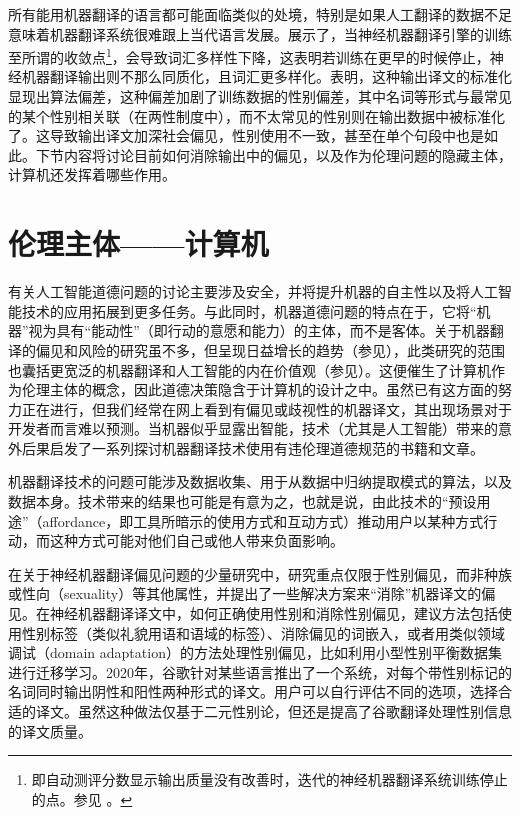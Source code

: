 \documentclass[output=paper]{langscibook}
\begin{document}
所有能用机器翻译的语言都可能面临类似的处境，特别是如果人工翻译的数据不足意味着机器翻译系统很难跟上当代语言发展。\citet{VanmassenhoveWay2019}展示了，当神经机器翻译引擎的训练至所谓的收敛点\footnote{即自动测评分数显示输出质量没有改善时，迭代的神经机器翻译系统训练停止的点。参见 。}，会导致词汇多样性下降，这表明若训练在更早的时候停止，神经机器翻译输出则不那么同质化，且词汇更多样化。\citet{Vanmassenhove2019}表明，这种输出译文的标准化显现出算法偏差，这种偏差加剧了训练数据的性别偏差，其中名词等形式与最常见的某个性别相关联（在两性制度中），而不太常见的性别则在输出数据中被标准化了。这导致输出译文加深社会偏见，性别使用不一致，甚至在单个句段中也是如此。下节内容将讨论目前如何消除输出中的偏见，以及作为伦理问题的隐藏主体，计算机还发挥着哪些作用。

\section{伦理主体——计算机}\label{sec:moorkens:6}
有关人工智能道德问题的讨论主要涉及安全，并将提升机器的自主性以及将人工智能技术的应用拓展到更多任务。与此同时，机器道德问题的特点在于，它将“机器”视为具有“能动性”（即行动的意愿和能力）的主体，而不是客体。关于机器翻译的偏见和风险的研究虽不多，但呈现日益增长的趋势（参见），此类研究的范围也囊括更宽泛的机器翻译和人工智能的内在价值观（参见）。这便催生了计算机作为伦理主体的概念，因此道德决策隐含于计算机的设计之中。虽然已有这方面的努力正在进行，但我们经常在网上看到有偏见或歧视性的机器译文，其出现场景对于开发者而言难以预测。当机器似乎显露出智能，技术（尤其是人工智能）带来的意外后果启发了一系列探讨机器翻译技术使用有违伦理道德规范的书籍和文章。

机器翻译技术的问题可能涉及数据收集、用于从数据中归纳提取模式的算法，以及数据本身。技术带来的结果也可能是有意为之，也就是说，由此技术的“预设用途”（affordance，即工具所暗示的使用方式和互动方式）推动用户以某种方式行动，而这种方式可能对他们自己或他人带来负面影响。

在关于神经机器翻译偏见问题的少量研究中，研究重点仅限于性别偏见，而非种族或性向（sexuality）等其他属性，并提出了一些解决方案来“消除”机器译文的偏见。在神经机器翻译译文中，如何正确使用性别和消除性别偏见，建议方法包括使用性别标签（类似礼貌用语和语域的标签）、消除偏见的词嵌入，或者用类似领域调试（domain adaptation）的方法处理性别偏见，比如利用小型性别平衡数据集进行迁移学习\citep{TomalinUllmann2021}。2020年，谷歌针对某些语言推出了一个系统，对每个带性别标记的名词同时输出阴性和阳性两种形式的译文。用户可以自行评估不同的选项，选择合适的译文。虽然这种做法仅基于二元性别论，但还是提高了谷歌翻译处理性别信息的译文质量\citep{Johnson2020}。
\end{document}
